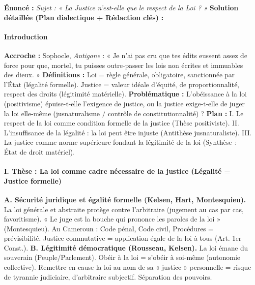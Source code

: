 \documentclass[11pt]{article}
\begin{document}
\begin{exoresolu}
    \textbf{Énoncé :} \textit{Sujet : « La Justice n'est-elle que le respect de la Loi ? »}
    \tcblower
    \textbf{Solution détaillée (Plan dialectique + Rédaction clés) :}
    \paragraph{Introduction}
    \textbf{Accroche :} Sophocle, \emph{Antigone} : « Je n'ai pas cru que tes édits eussent assez de force pour que, mortel, tu puisses outre-passer les lois non écrites et immuables des dieux. »
    \textbf{Définitions :} Loi = règle générale, obligatoire, sanctionnée par l'État (légalité formelle). Justice = valeur idéale d'équité, de proportionnalité, respect des droits (légitimité matérielle).
    \textbf{Problématique :} L'obéissance à la loi (positivisme) épuise-t-elle l'exigence de justice, ou la justice exige-t-elle de juger la loi elle-même (jusnaturalisme / contrôle de constitutionnalité) ?
    \textbf{Plan :} I. Le respect de la loi comme condition formelle de la justice (Thèse positiviste). II. L'insuffisance de la légalité : la loi peut être injuste (Antithèse jusnaturaliste). III. La justice comme norme supérieure fondant la légitimité de la loi (Synthèse : État de droit matériel).
    \paragraph{I. Thèse : La loi comme cadre nécessaire de la justice (Légalité = Justice formelle)}
    \textbf{A. Sécurité juridique et égalité formelle (Kelsen, Hart, Montesquieu).} La loi générale et abstraite protège contre l'arbitraire (jugement au cas par cas, favoritisme). « Le juge est la bouche qui prononce les paroles de la loi » (Montesquieu). Au Cameroun : Code pénal, Code civil, Procédures = prévisibilité. Justice commutative = application égale de la loi à tous (Art. 1er Const.).
    \textbf{B. Légitimité démocratique (Rousseau, Kelsen).} La loi émane du souverain (Peuple/Parlement). Obéir à la loi = s'obéir à soi-même (autonomie collective). Remettre en cause la loi au nom de sa « justice » personnelle = risque de tyrannie judiciaire, d'arbitraire subjectif. Séparation des pouvoirs.

\end{exoresolu}
\end{document}
